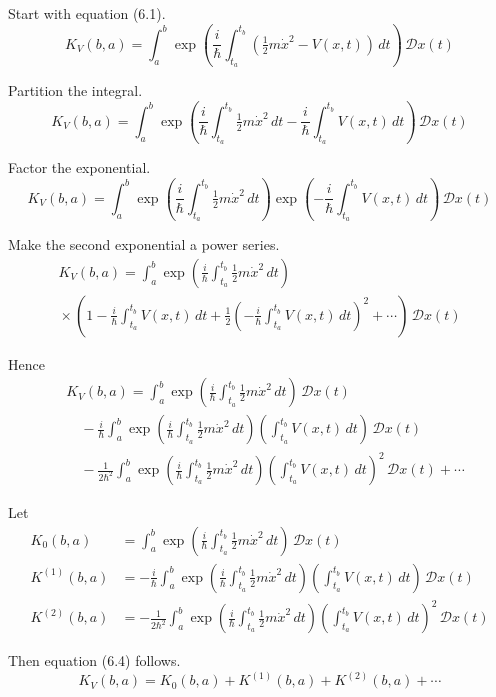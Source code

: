 \documentclass[12pt]{article}
\begin{document}
Start with equation (6.1).
\begin{equation*}
K_V(b,a)=\int_a^b\exp\left(
\frac{i}{\hbar}
\int_{t_a}^{t_b}
\left(\tfrac{1}{2}m\dot x^2-V(x,t)\right)
\,dt\right)\,\mathcal Dx(t)
\tag{6.1}
\end{equation*}

Partition the integral.
\begin{equation*}
K_V(b,a)=\int_a^b
\exp\left(
\frac{i}{\hbar}
\int_{t_a}^{t_b}\tfrac{1}{2}m\dot x^2
\,dt
-
\frac{i}{\hbar}
\int_{t_a}^{t_b}V(x,t)
\,dt
\right)\,\mathcal Dx(t)
\end{equation*}

Factor the exponential.
\begin{equation*}
K_V(b,a)=\int_a^b
\exp\left(\frac{i}{\hbar}\int_{t_a}^{t_b}\tfrac{1}{2}m\dot x^2\,dt\right)
\exp\left(-\frac{i}{\hbar}\int_{t_a}^{t_b}V(x,t)\,dt\right)
\,\mathcal Dx(t)
\end{equation*}

Make the second exponential a power series.
\begin{multline*}
K_V(b,a)=\int_a^b\exp\left(\frac{i}{\hbar}\int_{t_a}^{t_b}\tfrac{1}{2}m\dot x^2\,dt\right)
\\
{}\times\left(1
-\frac{i}{\hbar}\int_{t_a}^{t_b}V(x,t)\,dt
+\frac{1}{2}\left(-\frac{i}{\hbar}\int_{t_a}^{t_b}V(x,t)\,dt\right)^2
+\cdots
\right)\,\mathcal Dx(t)
\end{multline*}

Hence
\begin{align*}
&K_V(b,a)=\int_a^b\exp\left(\frac{i}{\hbar}\int_{t_a}^{t_b}\tfrac{1}{2}m\dot x^2\,dt\right)\,\mathcal Dx(t)
\\
&\quad{}-\frac{i}{\hbar}
\int_a^b\exp\left(\frac{i}{\hbar}\int_{t_a}^{t_b}\tfrac{1}{2}m\dot x^2\,dt\right)
\left(\int_{t_a}^{t_b}V(x,t)\,dt\right)\,\mathcal Dx(t)
\\
&\quad{}-\frac{1}{2\hbar^2}
\int_a^b\exp\left(\frac{i}{\hbar}\int_{t_a}^{t_b}\tfrac{1}{2}m\dot x^2\,dt\right)
\left(\int_{t_a}^{t_b}V(x,t)\,dt\right)^2\,\mathcal Dx(t)
+\cdots
\end{align*}

Let
\begin{align*}
K_0(b,a)&=\int_a^b\exp\left(\frac{i}{\hbar}\int_{t_a}^{t_b}\tfrac{1}{2}m\dot x^2\,dt\right)\,\mathcal Dx(t)
\\
K^{(1)}(b,a)&=-\frac{i}{\hbar}
\int_a^b\exp\left(\frac{i}{\hbar}\int_{t_a}^{t_b}\tfrac{1}{2}m\dot x^2\,dt\right)
\left(\int_{t_a}^{t_b}V(x,t)\,dt\right)\,\mathcal Dx(t)
\\
K^{(2)}(b,a)&=-\frac{1}{2\hbar^2}
\int_a^b\exp\left(\frac{i}{\hbar}\int_{t_a}^{t_b}\tfrac{1}{2}m\dot x^2\,dt\right)
\left(\int_{t_a}^{t_b}V(x,t)\,dt\right)^2\,\mathcal Dx(t)
\end{align*}

Then equation (6.4) follows.
\begin{equation*}
K_V(b,a)=K_0(b,a)+K^{(1)}(b,a)+K^{(2)}(b,a)+\cdots
\tag{6.4}
\end{equation*}
\end{document}
